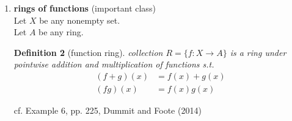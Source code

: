 \documentclass[10pt]{amsart}
\newtheorem{definition}{Definition}
\begin{document}
\begin{multicols*}{2}
\begin{enumerate}
\begin{definition}[(real) Hamiltonian Quaternions]
\begin{equation}
\begin{aligned}
		& ki = -ik = j
		\end{aligned}
		\end{equation}
	\end{definition}
Working out the multiplication
\[
\begin{gathered}
(a+bi + cj + dk)(a'+b'i + c'j + d'k) =  \\
= \begin{aligned}
& aa' + ab' i + ac'j + ad'k + ba' i - bb' + bc' k -bd' j + \\
& ca'j - cb' k - cc' + cd' i + da' k + db' j - dc' i -dd' = \\
\end{aligned} \\
= aa' - bb' -cc' -dd' + (ab' + ba' + cd' -dc')i + (ac' - bd' + ca' +db')j + (ad' + bc' - cb' + da')k 
\end{gathered}
\]
Hamiltonian Quaternions are noncommutative ring with identity ($1= 1 + 0i + 0j + 0k$). 

Similarly define \emph{rational} Hamiltonian Quaternions ring by taking $a,b,c,d\in \mathbb{Q}$.  

real and rational Hamiltonian Quaternions both are divison rings, where inverse of nonzero element defined as 


\begin{equation}
(a+bi +cj + dk)^{-1} = \frac{ a-bi -cj -dk}{ a^2 + b^2 + c^2 + d^2 }
\end{equation} cf. Example 5, pp. 224, Dummit and Foote (2014)\cite{DuFo2003}

\item \textbf{rings of functions} (important class) \\
Let $X$ be any nonempty set. \\
Let $A$ be any ring. 

\begin{definition}[function ring]
	collection $R= \lbrace f:X\to A \rbrace$ is a ring under pointwise addition and multiplication of functions s.t. 
	\begin{equation}
	\begin{aligned}
	(f+g)(x) & = f(x) + g(x) \\
	(fg)(x) & = f(x)g(x)
	\end{aligned}
	\end{equation}
\end{definition}
	
cf. Example 6, pp. 225, Dummit and Foote (2014)\cite{DuFo2003}
	
\end{enumerate}


\end{multicols*}
\end{document}

